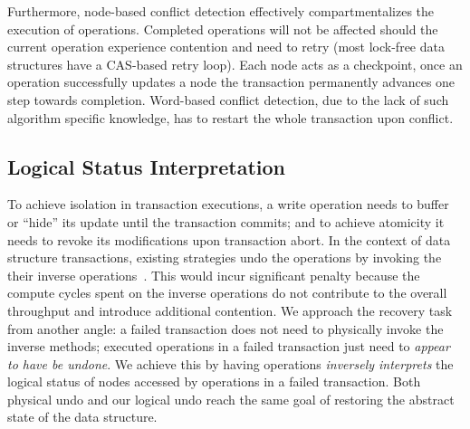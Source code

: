 \documentclass[10pt,conference,compsocconf]{IEEEtran}
\begin{document}
Furthermore, node-based conflict detection effectively compartmentalizes the execution of operations.
Completed operations will not be affected should the current operation experience contention and need to retry (most lock-free data structures have a CAS-based retry loop). 
Each node acts as a checkpoint, once an operation successfully updates a node the transaction permanently advances one step towards completion.
Word-based conflict detection, due to the lack of such algorithm specific knowledge, has to restart the whole transaction upon conflict. 

\subsection{Logical Status Interpretation}
\label{sec:logical}
To achieve isolation in transaction executions, a write operation needs to buffer or ``hide'' its update until the transaction commits; and to achieve atomicity it needs to revoke its modifications upon transaction abort.
In the context of data structure transactions, existing strategies undo the operations by invoking the their inverse operations~\cite{herlihy2008transactional}.
This would incur significant penalty because the compute cycles spent on the inverse operations do not contribute to the overall throughput and introduce additional contention.
We approach the recovery task from another angle: a failed transaction does not need to physically invoke the inverse methods; executed operations in a failed transaction just need to \emph{appear to have be undone}.
We achieve this by having operations \emph{inversely interprets} the logical status of nodes accessed by operations in a failed transaction.
Both physical undo and our logical undo reach the same goal of restoring the abstract state of the data structure. 
\end{document}
